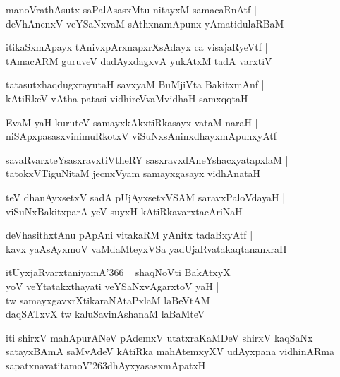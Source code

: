 \documentclass[twoside,12pt,openright]{book}
\def\S{\char'263}
\newcounter{shloka}[chapter]
\begin{document}
\begin{shloka}%
manoVrathAsutx saPalAsasxMtu nitayxM samacaRnAtf |\\
deVhAnenxV veYSaNxvaM sAthxnamApunx yAmatidulaRBaM 
\end{shloka}

\begin{shloka}%
itikaSxmApayx tAnivxpArxnapxrXsAdayx ca visajaRyeVtf |\\
tAmacARM guruveV dadAyxdagxvA yukAtxM tadA varxtiV 
\end{shloka}

\begin{shloka}%
tatasutxhaqdugxrayutaH savxyaM BuMjiVta BakitxmAnf |\\
kAtiRkeV vAtha patasi vidhireVvaMvidhaH samxqqtaH 
\end{shloka}

\begin{shloka}%
EvaM yaH kuruteV samayxkAkxtiRkasayx vataM naraH |\\
niSApxpasasxvinimuRkotxV viSuNxsAninxdhayxmApunxyAtf 
\end{shloka}

\begin{shloka}%
savaRvarxteYsasxravxtiVtheRY sasxravxdAneYshacxyatapxlaM |\\
tatokxVTiguNitaM jecnxVyam samayxgasayx vidhAnataH
\end{shloka}

\begin{shloka}%
teV dhanAyxsetxV sadA pUjAyxsetxVSAM saravxPaloVdayaH |\\
viSuNxBakitxparA yeV suyxH kAtiRkavarxtacAriNaH 
\end{shloka}

\begin{shloka}%
deVhasithxtAnu pApAni vitakaRM yAnitx tadaBxyAtf |\\
kavx yaAsAyxmoV vaMdaMteyxVSa yadUjaRvatakaqtananxraH 
\end{shloka}

\begin{shloka}%
itUyxjaRvarxtaniyamA\char'366 ~ shaqNoVti BakAtxyX \\
yoV veYtatakxthayati veYSaNxvAgarxtoV yaH |\\
tw samayxgavxrXtikaraNAtaPxlaM laBeVtAM  \\
daqSATxvX tw kaluSavinAshanaM laBaMteV 
\end{shloka}

\begin{center}
iti shirxV mahApurANeV pAdemxV utatxraKaMDeV shirxV kaqSaNx satayxBAmA saMvAdeV kAtiRka mahAtemxyXV 
udAyxpana vidhinARma sapatxnavatitamoV\S dhAyxyasasxmApatxH 
\end{center}
\end{document}
